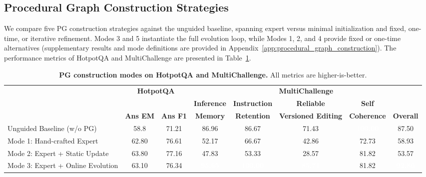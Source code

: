 \subsection{Procedural Graph Construction Strategies}
\label{sec:pg_construction}
We compare five PG construction strategies against the unguided baseline, spanning expert versus minimal initialization and fixed, one-time, or iterative refinement. Modes 3 and 5 instantiate the full evolution loop, while Modes 1, 2, and 4 provide fixed or one-time alternatives (supplementary results and mode definitions are provided in Appendix~\ref{app:procedural_graph_construction}). The performance metrics of HotpotQA and MultiChallenge are presented in Table~\ref{tab:performance_metrics}.

\begin{table}[thbp]
\scriptsize
\centering
\setlength{\aboverulesep}{0pt}
\setlength{\belowrulesep}{0pt}
\renewcommand{\arraystretch}{1}
\setlength{\tabcolsep}{5.4pt}
\caption{\textbf{PG construction modes on HotpotQA and MultiChallenge.} All metrics are higher-is-better.}
\label{tab:performance_metrics}
\begin{tabular}{l c c c c c c c}
\toprule
\rowcolor{GoogleBlue!15}
\cellcolor{GoogleBlue!15} & \multicolumn{2}{c}{\textbf{HotpotQA}} & \multicolumn{5}{c}{\textbf{MultiChallenge}} \\
\arrayrulecolor{white}\cmidrule(lr){2-3} \cmidrule(lr){4-8}\arrayrulecolor{black}
\rowcolor{GoogleBlue!15}
\cellcolor{GoogleBlue!15} & \cellcolor{GoogleBlue!15} & \cellcolor{GoogleBlue!15} & \textbf{Inference} & \textbf{Instruction} & \textbf{Reliable} & \textbf{Self} & \cellcolor{GoogleBlue!15} \\
\rowcolor{GoogleBlue!15}
\multirow{-3}{*}{\textbf{Construction Mode}} & \multirow{-2}{*}{\textbf{Ans EM}} & \multirow{-2}{*}{\textbf{Ans F1}} & \textbf{Memory} & \textbf{Retention} & \textbf{Versioned Editing} & \textbf{Coherence} & \multirow{-3}{*}{\textbf{Overall}} \\
\midrule
Unguided Baseline (w/o PG)         & 58.8 & 71.21 & 86.96 & 86.67 & 71.43 & \cellcolor{GoogleBlue}\textcolor{white}{\textbf{100.00}} & 87.50 \\
Mode 1: Hand-crafted Expert        & 62.80 & 76.61 & 52.17 & 66.67 & 42.86 & 72.73 & 58.93 \\
Mode 2: Expert + Static Update     & 63.80 & 77.16 & 47.83 & 53.33 & 28.57 & 81.82 & 53.57 \\
Mode 3: Expert + Online Evolution  & 63.10 & 76.34 & \cellcolor{GoogleBlue}\textcolor{white}{\textbf{95.65}} & \cellcolor{GoogleBlue}\textcolor{white}{\textbf{100.00}} & \cellcolor{GoogleBlue}\textcolor{white}{\textbf{85.71}} & 81.82 & \cellcolor{GoogleBlue}\textcolor{white}{\textbf{92.86}} \\

\end{tabular}
\end{table}
